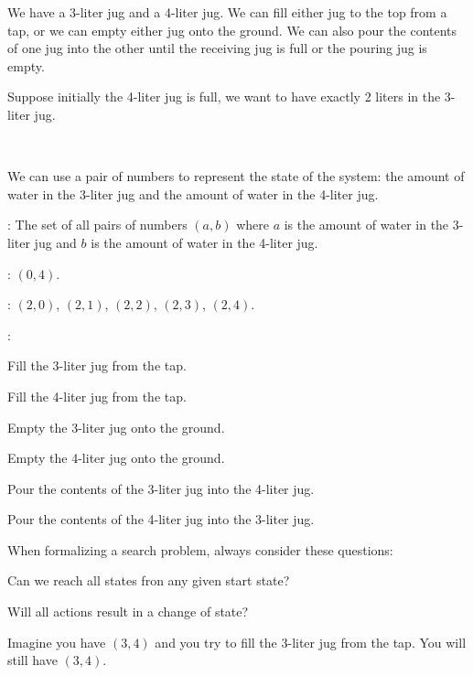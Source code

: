 \begin{example}
    We have a 3-liter jug and a 4-liter jug. We can fill either jug to the top from a tap, or we can empty either jug onto the ground. We can also pour the contents of one jug into the other until the receiving jug is full or the pouring jug is empty.

    Suppose initially the 4-liter jug is full, we want to have exactly 2 liters in the 3-liter jug.

    {~~~}

    We can use a pair of numbers to represent the state of the system: the amount of water in the 3-liter jug and the amount of water in the 4-liter jug.

    \begin{listu}
        \item {}: The set of all pairs of numbers $(a, b)$ where $a$ is the amount of water in the 3-liter jug and $b$ is the amount of water in the 4-liter jug.
        \item {}: $(0, 4)$.
        \item {}: $(2, 0)$, $(2, 1)$, $(2, 2)$, $(2, 3)$, $(2, 4)$.
        \item {}:
        \begin{listu}
            \item Fill the 3-liter jug from the tap.
            \item Fill the 4-liter jug from the tap.
            \item Empty the 3-liter jug onto the ground.
            \item Empty the 4-liter jug onto the ground.
            \item Pour the contents of the 3-liter jug into the 4-liter jug.
            \item Pour the contents of the 4-liter jug into the 3-liter jug.
        \end{listu}
    \end{listu}

    \begin{remark}
        When formalizing a search problem, always consider these questions:

        \begin{listo}
            \item Can we reach all states fron any given start state?

            \item Will all actions result in a change of state?

             Imagine you have $(3, 4)$ and you try to fill the 3-liter jug from the tap. You will still have $(3, 4)$.
        \end{listo}
    \end{remark}
\end{example}


